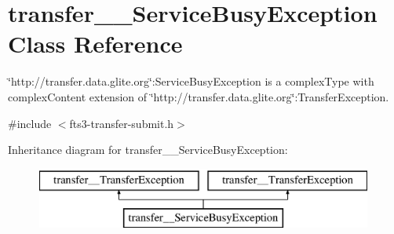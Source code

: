 \section{transfer\_\-\_\-ServiceBusyException Class Reference}
\label{classtransfer____ServiceBusyException}


\char`\"{}http://transfer.data.glite.org\char`\"{}:ServiceBusyException is a complexType with complexContent extension of \char`\"{}http://transfer.data.glite.org\char`\"{}:TransferException.  




{\ttfamily \#include $<$fts3-\/transfer-\/submit.h$>$}

Inheritance diagram for transfer\_\-\_\-ServiceBusyException:\begin{figure}[H]
\begin{center}
\leavevmode
\includegraphics[height=2.000000cm]{classtransfer____ServiceBusyException}
\end{center}
\end{figure}
